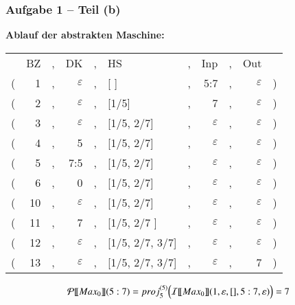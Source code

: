 \documentclass[aspectratio=1610,onlymath, ngerman]{beamer}
\renewcommand{\emph}[1]{\textbf{#1}}
\renewcommand{\epsilon}{\varepsilon}
\begin{document}
    \begin{frame} \frametitle{Aufgabe 1 -- Teil (b)}
    \small
    		\emph{Ablauf der abstrakten Maschine:} 
    		\begin{center}
    			\begin{tabular}{rrcrclcrcrl}
    				& BZ &,& DK &,& HS &,& Inp &,& Out & \\
    				( & 1 &,& $\epsilon$ &,& [ ] &,& 5:7 &,& $\epsilon$ & ) \\
    				( & 2 &,& $\epsilon$ &,& [1/5] &,& 7 &,& $\epsilon$ & ) \\
    				( & 3 &,& $\epsilon$ &,& [1/5, 2/7] &,& $\epsilon$ &,& $\epsilon$ & ) \\
    				( & 4 &,& 5 &,& [1/5, 2/7] &,& $\epsilon$ &,& $\epsilon$ & ) \\
    				( & 5 &,& 7:5 &,& [1/5, 2/7] &,& $\epsilon$ &,& $\epsilon$ & ) \\
    				( & 6 &,& 0 &,& [1/5, 2/7] &,& $\epsilon$ &,& $\epsilon$ & ) \\
    				( & 10 &,& $\epsilon$ &,& [1/5, 2/7] &,& $\epsilon$ &,& $\epsilon$ & ) \\
    				( & 11 &,& 7 &,& [1/5, 2/7 ] &,& $\epsilon$ &,& $\epsilon$ & ) \\
    				( & 12 &,& $\epsilon$ &,& [1/5, 2/7, 3/7] &,& $\epsilon$ &,& $\epsilon$ & ) \\
    				( & 13 &,& $\epsilon$ &,& [1/5, 2/7, 3/7] &,& $\epsilon$ &,& 7 & ) \\
    			\end{tabular}
    		\end{center}
    		
    		\pause   		

    		\begin{equation*}
    		\mathcal{P} [\![ Max_0 ]\!] (5:7) = proj_5^{(5)} \Bigl( \mathcal{I}[\![ Max_0 ]\!] (1,\epsilon, [],5:7,\epsilon) \Bigr) = 7
    		\end{equation*}
    \end{frame}
\end{document}
